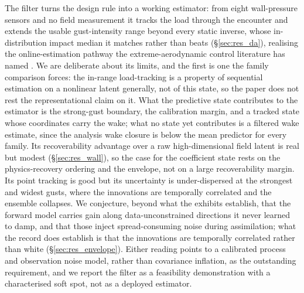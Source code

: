 The filter turns the design rule into a working estimator: from eight wall-pressure sensors and no field measurement it tracks the load through the encounter and extends the usable gust-intensity range beyond every static inverse, whose in-distribution impact median it matches rather than beats (\S\ref{sec:res_da}), realising the online-estimation pathway the extreme-aerodynamic control literature has named \citep{fukami2024control,mousavi2025,eldredge2025guide}. We are deliberate about its limits, and the first is one the family comparison forces: the in-range load-tracking is a property of sequential estimation on a nonlinear latent generally, not of this state, so the paper does not rest the representational claim on it. What the predictive state contributes to the estimator is the strong-gust boundary, the calibration margin, and a tracked state whose coordinates carry the wake; what no state yet contributes is a filtered wake estimate, since the analysis wake closure is below the mean predictor for every family. Its recoverability advantage over a raw high-dimensional field latent is real but modest (\S\ref{sec:res_wall}), so the case for the coefficient state rests on the physics-recovery ordering and the envelope, not on a large recoverability margin. Its point tracking is good but its uncertainty is under-dispersed at the strongest and widest gusts, where the innovations are temporally correlated and the ensemble collapses. We conjecture, beyond what the exhibits establish, that the forward model carries gain along data-unconstrained directions it never learned to damp, and that those inject spread-consuming noise during assimilation; what the record does establish is that the innovations are temporally correlated rather than white (\S\ref{sec:res_envelope}). Either reading points to a calibrated process and observation noise model, rather than covariance inflation, as the outstanding requirement, and we report the filter as a feasibility demonstration with a characterised soft spot, not as a deployed estimator.\re

